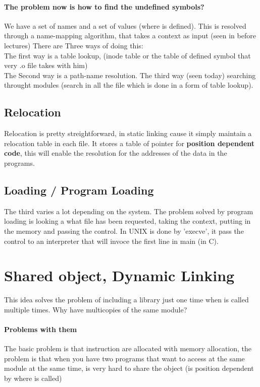 \documentclass{article}
\begin{document}
    \paragraph{The problem now is how to find the undefined symbols? }
      We have a set of names and a set of values (where is defined). This is resolved 
      through a name-mapping algorithm, that takes a context as input (seen in before lectures)
      There are Three ways of doing this: \\ The first way is a table lookup, (inode table or 
      the table of defined symbol that very .o file takes with him) \\ The Second way is a 
      path-name resolution. The third way (seen today) searching throught modules (search 
      in all the file which is done in a form of table lookup). 
  \subsection{Relocation}
    Relocation is pretty streightforward, in static linking cause it simply maintain 
    a relocation table in each file. It stores a table of pointer for \textbf{position
    dependent code}, this will enable the resolution for the addresses of the data in the
    programs.
  \subsection{Loading / Program Loading}
    The third varies a lot depending on the system. The problem solved by program
    loading is looking a what file has been requested, taking the context, putting 
    in the memory and passing the control. In UNIX is done by 'execve', it pass the 
    control to an interpreter that will invoce the first line in main (in C).
  \section{Shared object, Dynamic Linking}
    This idea solves the problem of including a library just one time when is called 
    multiple times. Why have multicopies of the same module?
    \paragraph{Problems with them} The basic problem is that instruction are allocated with
      memory allocation, the problem is that when you have two programs that want to access
      at the same module at the same time, is very hard to share the object (is position 
      dependent by where is called) 
\end{document}
